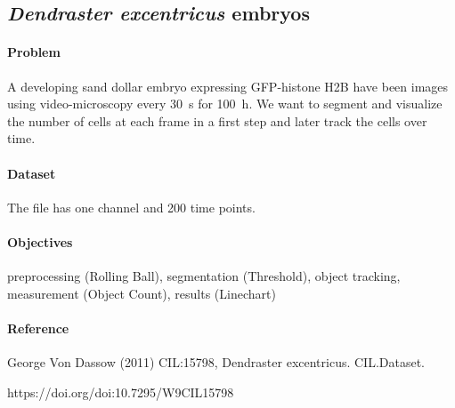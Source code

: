\subsection{\textit{Dendraster excentricus} embryos} \label{sec:dendraster-excentricus}

\paragraph{Problem}
A developing sand dollar embryo expressing GFP-histone H2B have been images using video-microscopy every \SI{30}{\second} for \SI{100}{\hour}. We want to segment and visualize the number of cells at each frame in a first step and later track the cells over time.

\paragraph{Dataset} The file  has one channel and 200 time points.

\paragraph{Objectives} 
preprocessing (Rolling Ball), 
segmentation (Threshold), 
object tracking, 
measurement (Object Count), 
results (Linechart)

\paragraph{Reference} 
George Von Dassow (2011) CIL:15798, Dendraster excentricus. CIL.Dataset. 

https://doi.org/doi:10.7295/W9CIL15798



